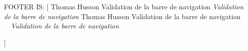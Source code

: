 \documentclass{scrartcl}
\makeatletter
\def\hussondoctitle{Validation de la barre de navigation}
\def\hussondocauthor{Thomas Husson}
\providecommand{\hussondocfooterleft}{}
\newcommand{\hussongetfooterleft}{%
  \ifx\hussondocfooterleft\@empty
    \ifx\hussondocauthor\@empty
      \ifx\hussondoctitle\@empty
      \else
        \textit{\hussondoctitle}%
      \fi
    \else
      \hussondocauthor
      \ifx\hussondoctitle\@empty
      \else
        \ \textendash{}\ \textit{\hussondoctitle}%
      \fi
    \fi
  \else
    \hussondocfooterleft
  \fi
}
\makeatother
\begin{document}
FOOTER IS: [\hussongetfooterleft]
\end{document}
